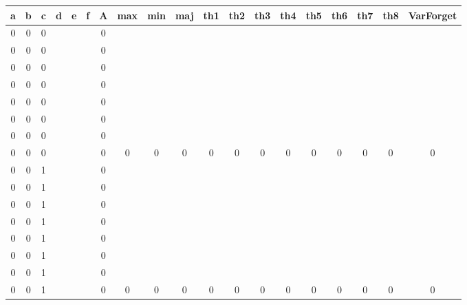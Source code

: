 \begin{table}[!tb]
    \centering
    \begin{tabular}{|c|c|c|c|c|c|c|c|c|c|c|c|c|c|c|c|c|c|c|}
        \hline
        \textbf{a} & \textbf{b} & \textbf{c} & \textbf{d} & \textbf{e} & \textbf{f} & \textbf{A} & \textbf{max} & \textbf{min} & \textbf{maj} & \textbf{th1} & \textbf{th2} & \textbf{th3} & \textbf{th4} & \textbf{th5} & \textbf{th6} & \textbf{th7} & \textbf{th8} & \textbf{VarForget} \\ \hline
        \rowcolor{gray!40} 0 & 0 & 0 &  &  &  & 0 &  &  &  &  &  &  &  &  &  &  &  &  \\ \hline
        \rowcolor{gray!40} 0 & 0 & 0 &  &  &  & 0 &  &  &  &  &  &  &  &  &  &  &  &  \\ \hline
        \rowcolor{gray!40} 0 & 0 & 0 &  &  &  & 0 &  &  &  &  &  &  &  &  &  &  &  &  \\ \hline
        \rowcolor{gray!40} 0 & 0 & 0 &  &  &  & 0 &  &  &  &  &  &  &  &  &  &  &  &  \\ \hline
        \rowcolor{gray!40} 0 & 0 & 0 &  &  &  & 0 &  &  &  &  &  &  &  &  &  &  &  &  \\ \hline
        \rowcolor{gray!40} 0 & 0 & 0 &  &  &  & 0 &  &  &  &  &  &  &  &  &  &  &  &  \\ \hline
        \rowcolor{gray!40} 0 & 0 & 0 &  &  &  & 0 &  &  &  &  &  &  &  &  &  &  &  &  \\ \hline
        \rowcolor{gray!40} 0 & 0 & 0 &  &  &  & 0 & 0 & 0 & 0 & 0 & 0 & 0 & 0 & 0 & 0 & 0 & 0 & 0 \\ \hline
        \rowcolor{blue!40} 0 & 0 & 1 &  &  &  & 0 &  &  &  &  &  &  &  &  &  &  &  &  \\ \hline
        \rowcolor{blue!40} 0 & 0 & 1 &  &  &  & 0 &  &  &  &  &  &  &  &  &  &  &  &  \\ \hline
        \rowcolor{blue!40} 0 & 0 & 1 &  &  &  & 0 &  &  &  &  &  &  &  &  &  &  &  &  \\ \hline
        \rowcolor{blue!40} 0 & 0 & 1 &  &  &  & 0 &  &  &  &  &  &  &  &  &  &  &  &  \\ \hline
        \rowcolor{blue!40} 0 & 0 & 1 &  &  &  & 0 &  &  &  &  &  &  &  &  &  &  &  &  \\ \hline
        \rowcolor{blue!40} 0 & 0 & 1 &  &  &  & 0 &  &  &  &  &  &  &  &  &  &  &  &  \\ \hline
        \rowcolor{blue!40} 0 & 0 & 1 &  &  &  & 0 &  &  &  &  &  &  &  &  &  &  &  &  \\ \hline
        \rowcolor{blue!40} 0 & 0 & 1 &  &  &  & 0 & 0 & 0 & 0 & 0 & 0 & 0 & 0 & 0 & 0 & 0 & 0 & 0 \\ \hline

\end{tabular}
\end{table}
